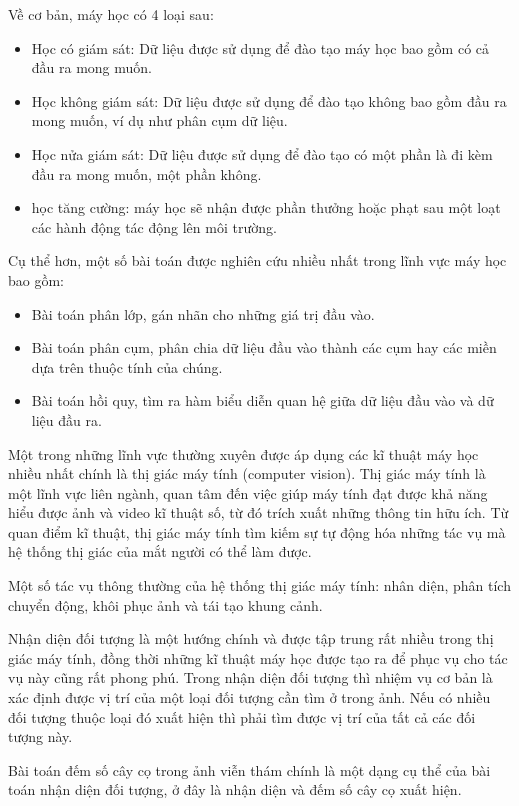 \documentclass[14pt, oneside, a4paper, openany]{scrartcl}
\begin{document}
Về cơ bản, máy học có 4 loại sau:
\begin{itemize}
	\item Học có giám sát: Dữ liệu được sử dụng để đào tạo máy học bao gồm có cả đầu ra mong muốn.
	\item Học không giám sát: Dữ liệu được sử dụng để đào tạo không bao gồm đầu ra mong muốn, ví dụ như phân cụm dữ liệu.
	\item Học nửa giám sát: Dữ liệu được sử dụng để đào tạo có một phần là đi kèm đầu ra mong muốn, một phần không.
	\item học tăng cường: máy học sẽ nhận được phần thưởng hoặc phạt sau một loạt các hành động tác động lên môi trường. 
\end{itemize}
Cụ thể hơn, một số bài toán được nghiên cứu nhiều nhất trong lĩnh vực máy học bao gồm:
\begin{itemize}
	\item Bài toán phân lớp, gán nhãn cho những giá trị đầu vào.
	\item Bài toán phân cụm, phân chia dữ liệu đầu vào thành các cụm hay các miền dựa trên thuộc tính của chúng.
	\item Bài toán hồi quy, tìm ra hàm biểu diễn quan hệ giữa dữ liệu đầu vào và dữ liệu đầu ra.
\end{itemize}

Một trong những lĩnh vực thường xuyên được áp dụng các kĩ thuật máy học nhiều nhất chính là thị giác máy tính (computer vision).
Thị giác máy tính  là một lĩnh vực liên ngành, quan tâm đến việc giúp máy tính đạt được khả năng hiểu được ảnh và video kĩ thuật số, từ đó trích xuất những thông tin hữu ích. Từ quan điểm kĩ thuật, thị giác máy tính tìm kiếm sự tự động hóa những tác vụ mà hệ thống thị giác của mắt người có thể làm được.

Một số tác vụ thông thường của hệ thống thị giác máy tính: nhân diện, phân tích chuyển động, khôi phục ảnh và tái tạo khung cảnh.

Nhận diện đối tượng là một hướng chính và được tập trung rất nhiều trong thị giác máy tính, đồng thời những kĩ thuật máy học được tạo ra để phục vụ cho tác vụ này cũng rất phong phú. Trong nhận diện đối tượng thì nhiệm vụ cơ bản là xác định được vị trí của một loại đối tượng cần tìm ở trong ảnh. Nếu có nhiều đối tượng thuộc loại đó xuất hiện thì phải tìm được vị trí của tất cả các đối tượng này.

Bài toán đếm số cây cọ trong ảnh viễn thám chính là một dạng cụ thể của bài toán nhận diện đối tượng, ở đây là nhận diện và đếm số cây cọ xuất hiện. 
\end{document}
